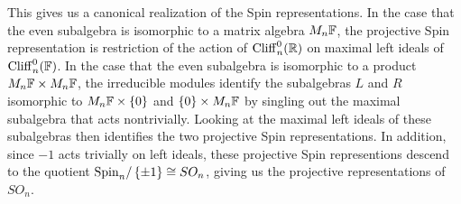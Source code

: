 This gives us a canonical realization of the Spin representations. In the
case that the even subalgebra is isomorphic to a matrix algebra $M_n\mathbb{F}$,
the projective Spin representation is restriction of the action of
$\operatorname{Cliff}_n^0(\mathbb{R})$ on maximal left ideals of $\operatorname{Cliff}_n^0(\mathbb{F})$. In the case
that the even subalgebra is isomorphic to a product $M_n\mathbb{F} \times M_n\mathbb{F}$,
the irreducible modules identify the subalgebras $L$ and $R$
isomorphic to $M_n\mathbb{F} \times \left\lbrace 0 \right\rbrace$ and $\left\lbrace 0 \right\rbrace \times M_n\mathbb{F}$ by singling out
the maximal subalgebra that acts nontrivially. Looking at the maximal left ideals
of these subalgebras then identifies the two projective Spin representations.
In addition, since $-1$ acts trivially on left ideals, these projective
Spin representions descend to the quotient $\mathrm{Spin}_n / \left\lbrace \pm 1 \right\rbrace \cong SO_n$,
giving us the projective representations of $SO_n$.
%
